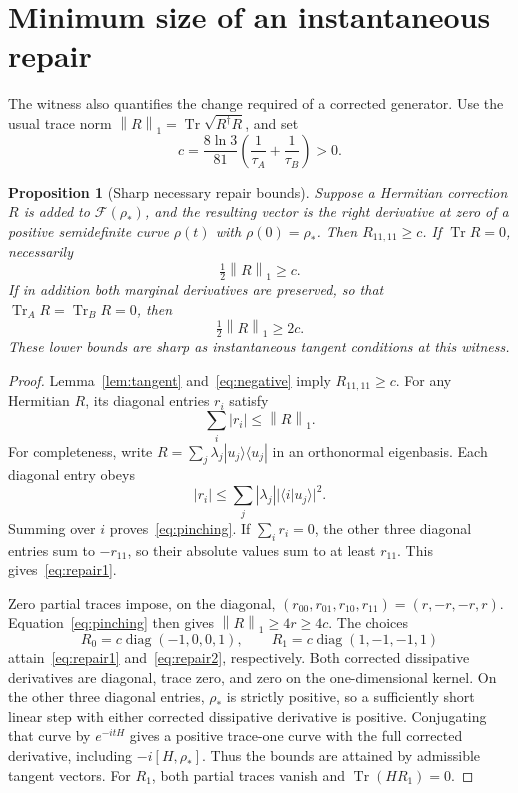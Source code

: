 \documentclass[11pt]{article}
\newtheorem{proposition}[theorem]{Proposition}
\newcommand{\tr}{\operatorname{Tr}}
\newcommand{\diag}{\operatorname{diag}}
\newcommand{\norm}[1]{\left\lVert#1\right\rVert}
\begin{document}
\section{Minimum size of an instantaneous repair}
The witness also quantifies the change required of a corrected generator. Use the usual trace norm $\norm{R}_1=\tr\sqrt{R^\dagger R}$, and set
\begin{equation}
 c=\frac{8\ln3}{81}\left(\frac1{\tau_A}+\frac1{\tau_B}\right)>0.
\end{equation}
\begin{proposition}[Sharp necessary repair bounds]\label{prop:repair}
Suppose a Hermitian correction $R$ is added to $\mathcal F(\rho_*)$, and the resulting vector is the right derivative at zero of a positive semidefinite curve $\rho(t)$ with $\rho(0)=\rho_*$. Then $R_{11,11}\geq c$. If $\tr R=0$, necessarily
\begin{equation}
 \tfrac12\norm{R}_1\geq c.\label{eq:repair1}
\end{equation}
If in addition both marginal derivatives are preserved, so that $\tr_A R=\tr_B R=0$, then
\begin{equation}
 \tfrac12\norm{R}_1\geq2c.\label{eq:repair2}
\end{equation}
These lower bounds are sharp as instantaneous tangent conditions at this witness.
\end{proposition}
\begin{proof}
Lemma~\ref{lem:tangent} and~\eqref{eq:negative} imply $R_{11,11}\geq c$. For any Hermitian $R$, its diagonal entries $r_i$ satisfy
\begin{equation}
 \sum_i|r_i|\leq\norm{R}_1.\label{eq:pinching}
\end{equation}
For completeness, write $R=\sum_j\lambda_j|u_j\rangle\langle u_j|$ in an orthonormal eigenbasis. Each diagonal entry obeys
\[
 |r_i|\leq\sum_j|\lambda_j||\langle i|u_j\rangle|^2.
\]
Summing over $i$ proves~\eqref{eq:pinching}. If $\sum_i r_i=0$, the other three diagonal entries sum to $-r_{11}$, so their absolute values sum to at least $r_{11}$. This gives~\eqref{eq:repair1}.

Zero partial traces impose, on the diagonal, $(r_{00},r_{01},r_{10},r_{11})=(r,-r,-r,r)$. Equation~\eqref{eq:pinching} then gives $\norm{R}_1\geq4r\geq4c$. The choices
\begin{equation}
 R_0=c\diag(-1,0,0,1),\qquad R_1=c\diag(1,-1,-1,1)
\end{equation}
attain~\eqref{eq:repair1} and~\eqref{eq:repair2}, respectively. Both corrected dissipative derivatives are diagonal, trace zero, and zero on the one-dimensional kernel. On the other three diagonal entries, $\rho_*$ is strictly positive, so a sufficiently short linear step with either corrected dissipative derivative is positive. Conjugating that curve by $e^{-itH}$ gives a positive trace-one curve with the full corrected derivative, including $-i[H,\rho_*]$. Thus the bounds are attained by admissible tangent vectors. For $R_1$, both partial traces vanish and $\tr(HR_1)=0$.
\end{proof}
\end{document}
